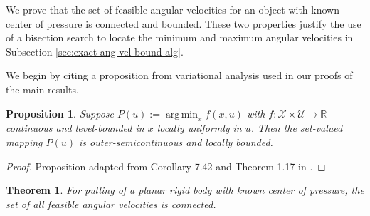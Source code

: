 \documentclass[conference]{IEEEtran}
\newtheorem{theorem}{Theorem}
\newtheorem{proposition}{Proposition}
\DeclareMathOperator*{\argmin}{arg\,min}
\begin{document}

We prove that the set of feasible angular velocities for an object
with known center of pressure is connected and bounded. These two
properties justify the use of a bisection search to locate the minimum
and maximum angular velocities in Subsection
\ref{sec:exact-ang-vel-bound-alg}.

We begin by citing a proposition from variational analysis used in our
proofs of the main results.
\begin{proposition}\label{prop:var-analysis}
  Suppose $P(u) := \argmin_x f(x,u)$ with
  $f:\mathcal{X}\times\mathcal{U}\rightarrow\mathbb{R}$ continuous and
  level-bounded in $x$ locally uniformly in $u$. Then the set-valued
  mapping $P(u)$ is outer-semicontinuous and locally bounded.
\end{proposition}

\begin{proof}
  Proposition adapted from Corollary 7.42 and Theorem 1.17 in
  \cite{Rockafellar}.
\end{proof}

\begin{theorem}\label{thm:angular-velocities}
  For pulling of a planar rigid body with known center of pressure,
  the set of all feasible angular velocities is connected.
\end{theorem}
\end{document}
